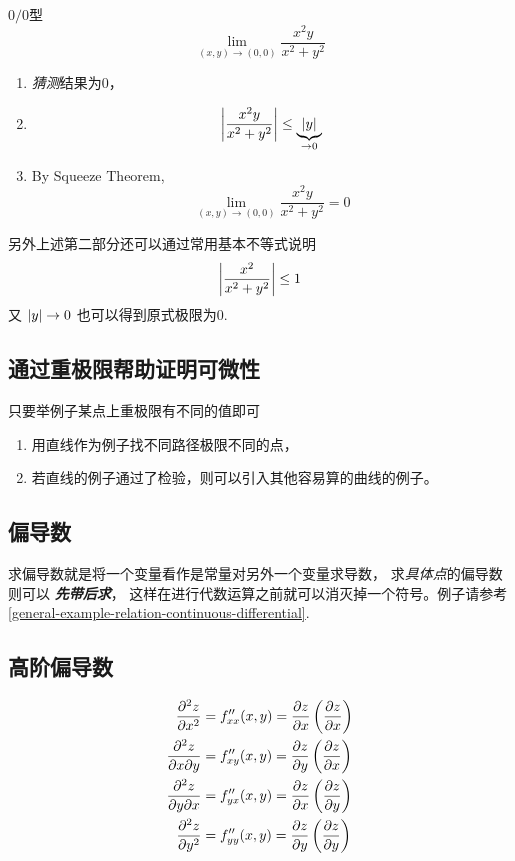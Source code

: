 \begin{example}
    \label{multi-var-dervative-example}
    $0/0$型
    \[
        \lim_{(x, y) \to (0, 0)} \dfrac{x^2 y}{x^2 + y^2} 
    \]

    \begin{enumerate}
        \item \emph{猜测}结果为0，
        \item 
            \[
                \abs*{\dfrac{x^2 y}{x^2 + y^2}} \leq \underbrace{\abs*{y}}_{\to 0}
            \]
        \item By Squeeze Theorem, 
            \[
                \lim_{(x, y) \to (0, 0)} \dfrac{x^2 y}{x^2 + y^2} = 0
            \]
    \end{enumerate}
    另外上述第二部分还可以通过常用基本不等式说明
    \[
        \abs*{\dfrac{x^2}{x^2 + y^2}} \leq 1
    \]
    又 $\abs*{y} \to 0$ 也可以得到原式极限为$0$.
\end{example}

\subsection{通过重极限帮助证明可微性}

只要举例子某点上重极限有不同的值即可
\begin{enumerate}
    \item 用直线作为例子找不同路径极限不同的点，
    \item 若直线的例子通过了检验，则可以引入其他容易算的曲线的例子。
\end{enumerate}

\subsection{偏导数}
\label{partial-deverative}

求偏导数就是将一个变量看作是常量对另外一个变量求导数，
求\emph{具体点}的偏导数则可以 \textbf{\emph{先带后求}}，
这样在进行代数运算之前就可以消灭掉一个符号。例子请参考 \ref{general-example-relation-continuous-differential}.

\subsection{高阶偏导数}
\begin{align}
    \dfrac{\partial^2 z}{\partial x^2}          &= f''_{xx}(x, y) = \dfrac{\partial z}{\partial x}\left(\dfrac{\partial z}{\partial x}\right) \notag \\
    \dfrac{\partial^2 z}{\partial x \partial y} &= f''_{xy}(x, y) = \dfrac{\partial z}{\partial y}\left(\dfrac{\partial z}{\partial x}\right) \label{eq:x-first-y-latter} \\
    \dfrac{\partial^2 z}{\partial y \partial x} &= f''_{yx}(x, y) = \dfrac{\partial z}{\partial x}\left(\dfrac{\partial z}{\partial y}\right) \label{eq:y-first-x-latter} \\
    \dfrac{\partial^2 z}{\partial y^2}          &= f''_{yy}(x, y) = \dfrac{\partial z}{\partial y}\left(\dfrac{\partial z}{\partial y}\right) \notag
\end{align}

